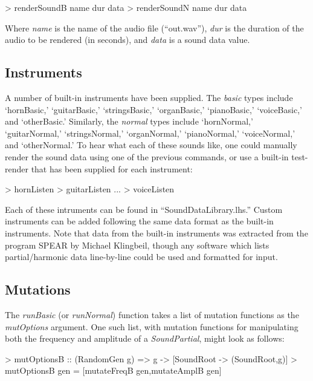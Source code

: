 \documentclass[11pt]{article}
\begin{document}
\begin{code}
> renderSoundB name dur data
> renderSoundN name dur data
\end{code}

Where \emph{name} is the name of the audio file (``out.wav''), \emph{dur} is the duration of the audio to be rendered (in seconds), and \emph{data} is a sound data value.

\subsection{Instruments}

A number of built-in instruments have been supplied. The \emph{basic} types include `hornBasic,' `guitarBasic,' `stringsBasic,' `organBasic,' `pianoBasic,' `voiceBasic,' and `otherBasic.' Similarly, the \emph{normal} types include `hornNormal,' `guitarNormal,' `stringsNormal,' `organNormal,' `pianoNormal,' `voiceNormal,' and `otherNormal.' 
To hear what each of these sounds like, one could manually render the sound data using one of the previous commands, or use a built-in test-render that has been supplied for each instrument:

\begin{code}
> hornListen
> guitarListen
...
> voiceListen
\end{code}

Each of these intruments can be found in ``SoundDataLibrary.lhs.'' Custom instruments can be added following the same data format as the built-in instruments. Note that data from the built-in instruments was extracted from the program SPEAR by Michael Klingbeil\cite{klingbeil}, though any software which lists partial/harmonic data line-by-line could be used and formatted for input.

\subsection{Mutations}

The \emph{runBasic} (or \emph{runNormal}) function takes a list of mutation functions as the \emph{mutOptions} argument. One such list, with mutation functions for manipulating both the frequency and amplitude of a \emph{SoundPartial}, might look as follows:

\begin{code}
> mutOptionsB :: (RandomGen g) => g -> [SoundRoot -> (SoundRoot,g)]
> mutOptionsB gen = [mutateFreqB gen,mutateAmplB gen]
\end{code}
\end{document}
